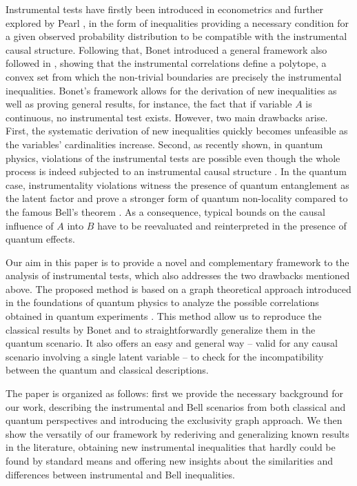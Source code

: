 \documentclass[letterpaper]{article}
\begin{document}
Instrumental tests have firstly been introduced in econometrics
\cite{Wooldridge2015} and further explored by Pearl \cite{pearl1995},
in the form of inequalities providing a necessary condition for a
given observed probability distribution to be compatible with the
instrumental causal structure. Following that, Bonet \cite{bonet2001}
introduced a general framework also followed in \cite{Ramsahai2012},
showing that the instrumental correlations define a polytope, a convex
set from which the non-trivial boundaries are precisely the instrumental
inequalities. Bonet's framework allows for the derivation of new
inequalities as well as proving general results, for instance, the fact
that if variable $A$ is continuous, no instrumental test exists. However,
two main drawbacks arise. First, the systematic derivation of new
inequalities quickly becomes unfeasible as the variables' cardinalities
increase. Second, as recently shown, in quantum physics, violations of
the instrumental tests are possible even though the whole process is
indeed subjected to an instrumental causal structure \cite{chaves2018,
himbeeck2018}. In the quantum case, instrumentality violations witness
the presence of quantum entanglement as the latent factor and prove
a stronger form of quantum non-locality compared to the famous Bell's
theorem \cite{chaves2018}. As a consequence, typical bounds on the causal
influence of $A$ into $B$ have to be reevaluated and reinterpreted in
the presence of quantum effects.

Our aim in this paper is to provide a novel and complementary framework
to the analysis of instrumental tests, which also addresses the two
drawbacks mentioned above. The proposed method is based on a graph
theoretical approach introduced in the foundations of quantum physics
to analyze the possible correlations obtained in quantum experiments
\cite{cabello2014,rabelo2014}. This method allow us to reproduce the
classical results by Bonet and to straightforwardly generalize them in
the quantum scenario. It also offers an easy and general way -- valid
for any causal scenario involving a single latent variable -- to check
for the incompatibility between the quantum and classical descriptions.

The paper is organized as follows: first we provide the necessary
background for our work, describing the instrumental and Bell scenarios
from both classical and quantum perspectives and introducing the
exclusivity graph approach. We then show the versatily of our framework
by rederiving and generalizing known results in the literature, obtaining
new instrumental inequalities that hardly could be found by standard
means and offering new insights about the similarities and differences
between instrumental and Bell inequalities.
\end{document}

